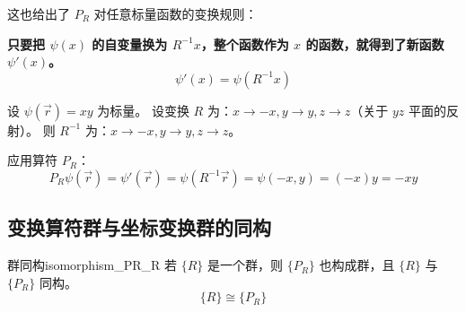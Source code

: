 这也给出了 $P_R$ 对任意标量函数的变换规则：

\textbf{只要把 $\psi(x)$ 的自变量换为 $R^{-1}x$，整个函数作为 $x$ 的函数，就得到了新函数 $\psi'(x)$。}
\begin{equation}
    \psi'(x) = \psi(R^{-1}x)
\end{equation}

\begin{example}
    设 $\psi(\vec{r}) = xy$ 为标量。
    设变换 $R$ 为：$x \to -x, y \to y, z \to z$（关于 $yz$ 平面的反射）。
    则 $R^{-1}$ 为：$x \to -x, y \to y, z \to z$。
    
    应用算符 $P_R$：
    \begin{equation}
        P_R \psi(\vec{r}) = \psi'(\vec{r}) = \psi(R^{-1}\vec{r}) = \psi(-x, y) = (-x)y = -xy
    \end{equation}
\end{example}

\subsection{变换算符群与坐标变换群的同构}
\begin{theorem}{群同构}{isomorphism_PR_R}
    若 $\{R\}$ 是一个群，则 $\{P_R\}$ 也构成群，且 $\{R\}$ 与 $\{P_R\}$ 同构。
    \begin{equation}
        \{R\} \cong \{P_R\}
    \end{equation}
\end{theorem}

